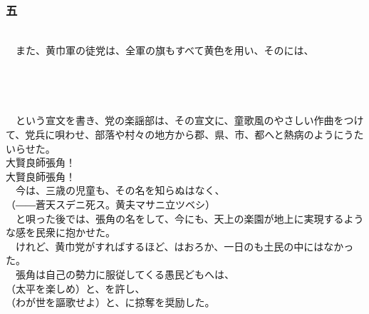 \documentclass[
  paper=a5,
  fontsize=10pt,
  jafontsize=9.5pt,
  tate,                  %
  open_bracket_pos=nibu, %
]{jlreq}
\begin{document}
\\

\subsubsection{五}

\\


　また、黄巾軍の徒党は、全軍の旗もすべて黄色を用い、そのには、\\

\\

\\

\\

\\



　という宣文を書き、党の楽謡部は、その宣文に、童歌風のやさしい作曲をつけて、党兵に唄わせ、部落や村々の地方から郡、県、市、都へと熱病のようにうたいらせた。\\



大賢良師張角！\\


大賢良師張角！\\



　今は、三歳の児童も、その名を知らぬはなく、\\


（――蒼天スデニ死ス。黄夫マサニ立ツベシ）\\


　と唄った後では、張角の名をして、今にも、天上の楽園が地上に実現するような感を民衆に抱かせた。\\


　けれど、黄巾党がすればするほど、はおろか、一日のも土民の中にはなかった。\\


　張角は自己の勢力に服従してくる愚民どもへは、\\


（太平を楽しめ）と、を許し、\\


（わが世を謳歌せよ）と、に掠奪を奨励した。\\
\end{document}
